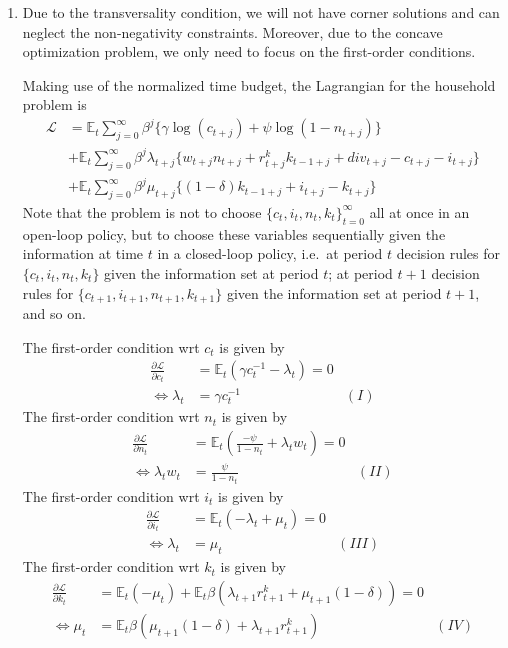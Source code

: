 \begin{enumerate}

\item
Due to the transversality condition,
  we will not have corner solutions and can neglect the non-negativity constraints.
Moreover, due to the concave optimization problem, we only need to focus on the first-order conditions.

Making use of the normalized time budget, the Lagrangian for the household problem is
\begin{align*}
\mathcal{L} &= \mathbb{E}_{t} \sum_{j=0}^{\infty} \beta^j \Bigg \{
  \gamma \log(c_{t+j}) + \psi \log(1-n_{t+j})
\Bigg \}
\\
&+ \mathbb{E}_{t} \sum_{j=0}^{\infty} \beta^j \lambda_{t+j} \Bigg \{
  w_{t+j} n_{t+j} + r^{k}_{t+j} k_{t-1+j} + {div}_{t+j} - c_{t+j} - i_{t+j}
\Bigg \}
\\
&+ \mathbb{E}_{t} \sum_{j=0}^{\infty} \beta^j \mu_{t+j} \Bigg \{
(1-\delta)k_{t-1+j} + i_{t+j} - k_{t+j}
\Bigg \}
\end{align*}
Note that the problem is not to choose \({\{c_t,i_t,n_t,k_{t}\}}_{t=0}^{\infty}\) all at once in an open-loop policy,
  but to choose these variables sequentially given the information at time \(t\) in a closed-loop policy,
  i.e.\ at period \(t\) decision rules for \({\{c_t,i_t,n_t,k_{t}\}}\) given the information set at period \(t\);
  at period \(t+1\) decision rules for \({\{c_{t+1},i_{t+1},n_{t+1},k_{t+1}\}}\) given the information set at period \(t+1\),
  and so on.

The first-order condition wrt \(c_t\) is given by
\begin{align*}
\frac{\partial \mathcal{L}}{\partial c_{t}} &= \mathbb{E}_{t} \left(\gamma c_t^{-1}-\lambda_{t}\right) = 0
\\
\Leftrightarrow \lambda_{t} &= \gamma c_{t}^{-1} & (I)
\end{align*}
The first-order condition wrt \(n_t\) is given by
\begin{align*}
\frac{\partial \mathcal{L}}{\partial n_{t}} &= \mathbb{E}_{t} \left(\frac{-\psi}{1-n_{t}} + \lambda_{t} w_{t}\right) = 0
\\
\Leftrightarrow \lambda_{t} w_{t} &= \frac{\psi}{1-n_{t}} &(II)
\end{align*}
The first-order condition wrt \(i_{t}\) is given by
\begin{align*}
\frac{\partial \mathcal{L}}{\partial i_{t}} &= \mathbb{E}_{t} \left(-\lambda_{t} + \mu_{t}\right) = 0
\\
\Leftrightarrow \lambda_{t} &= \mu_{t} & (III)
\end{align*}
The first-order condition wrt \(k_{t}\) is given by
\begin{align*}
\frac{\partial \mathcal{L}}{\partial k_{t}} &= \mathbb{E}_{t} (-\mu_{t}) + 
	\mathbb{E}_{t} \beta \left(\lambda_{t+1} r^{k}_{t+1} + \mu_{t+1}(1-\delta)\right) = 0
\\
\Leftrightarrow \mu_{t} &= \mathbb{E}_{t} \beta(\mu_{t+1}(1-\delta) + \lambda_{t+1} r^{k}_{t+1}) & (IV)
\end{align*}


\end{enumerate}
